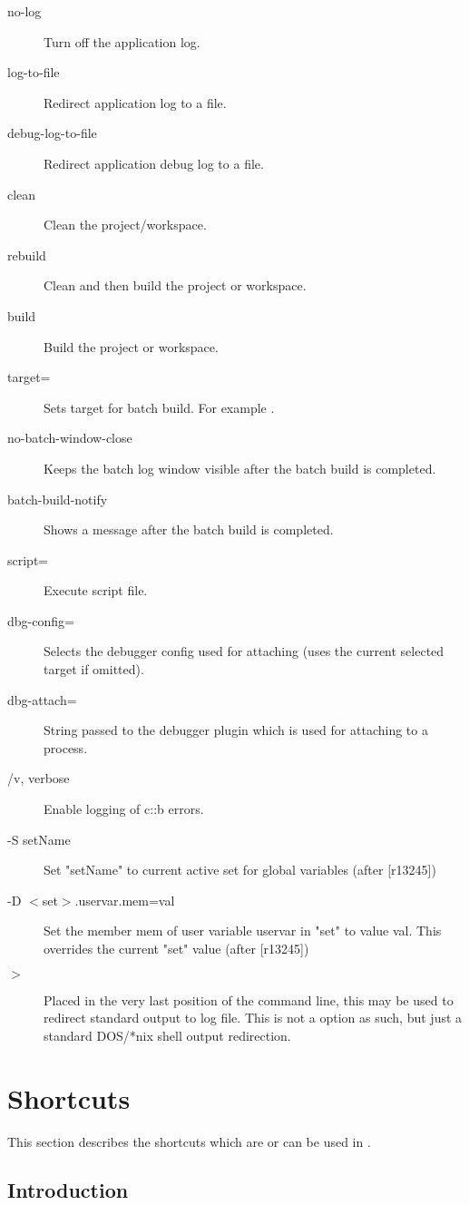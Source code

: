 \begin{description}
\item[\opt{--}no-log] Turn off the application log.
\item[\opt{--}log-to-file] Redirect application log to a file.
\item[\opt{--}debug-log-to-file] Redirect application debug log to a file.
\item[\opt{--}clean] Clean the project/workspace.
\item[\opt{--}rebuild] Clean and then build the project or workspace.
\item[\opt{--}build] Build the project or workspace.
\item[\opt{--}target=] Sets target for batch build. For example .
\item[\opt{--}no-batch-window-close] Keeps the batch log window visible after the batch build is completed.
\item[\opt{--}batch-build-notify] Shows a message after the batch build is completed.
\item[\opt{--}script=] Execute script file.
\item[\opt{--}dbg-config=] Selects the debugger config used for attaching (uses the current selected target if omitted).
\item[\opt{--}dbg-attach=] String passed to the debugger plugin which is used for attaching to a process.
\item[/v, \opt{--}verbose] Enable logging of c::b errors.
\item[-S setName] Set "setName" to current active set for global variables (after [r13245])
\item[-D $<$set$>$.uservar.mem=val] Set the member mem of user variable uservar in "set" to value val. This overrides the current "set" value (after [r13245])
\item[$>$ ] Placed in the very last position of the command line, this may be used to redirect standard output to log file. This is not a \codeblocks option as such, but just a standard DOS/*nix shell output redirection.
\end{description}
\fi

\section{Shortcuts}

This section describes the shortcuts which are or can be used in \codeblocks.

\subsection{Introduction}

